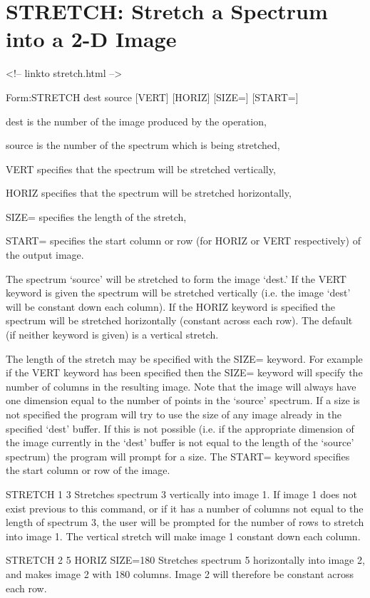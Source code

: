 \section{STRETCH: Stretch a Spectrum into a 2-D Image}
\begin{rawhtml}
<!-- linkto stretch.html -->
\end{rawhtml}
\begin{command}
  \item[Form:STRETCH dest source {[VERT]} {[HORIZ]} {[SIZE=]} 
       {[START=]}\hfill]{}
  \item[dest]{is the number of the image produced by the operation,}
  \item[source]{is the number of the spectrum which is being stretched,}
  \item[VERT]{specifies that the spectrum will be stretched vertically,}
  \item[HORIZ]{specifies that the spectrum will be stretched horizontally,}
  \item[SIZE=]{specifies the length of the stretch,}
  \item[START=]{specifies the start column or row (for HORIZ or
       VERT respectively) of the output image.}
\end{command}

The spectrum `source' will be stretched to form the image `dest.'  If the
VERT keyword is given the spectrum will be stretched vertically (i.e. the
image `dest' will be constant down each column).  If the HORIZ keyword is
specified the spectrum will be stretched horizontally (constant across each
row).  The default (if neither keyword is given) is a vertical stretch.

The length of the stretch may be specified with the SIZE= keyword.  For
example if the VERT keyword has been specified then the SIZE= keyword will
specify the number of columns in the resulting image.  Note that the image
will always have one dimension equal to the number of points in the
`source' spectrum.  If a size is not specified the program will try to use
the size of any image already in the specified `dest' buffer.  If this is
not possible (i.e. if the appropriate dimension of the image currently in
the `dest' buffer is not equal to the length of the `source' spectrum) the
program will prompt for a size.  The START= keyword specifies the start
column or row of the image.

\begin{example}
  \item[STRETCH 1 3\hfill]{Stretches spectrum 3 vertically into image 1.
       If image 1 does not exist previous to this command, or if it has a
       number of columns not equal to the length of spectrum 3, the user
       will be prompted for the number of rows to stretch into image 1.
       The vertical stretch will make image 1 constant down each column.}

  \item[STRETCH 2 5 HORIZ SIZE=180\hfill]{Stretches spectrum 5 horizontally
       into image 2, and makes image 2 with 180 columns.  Image 2 will
       therefore be constant across each row.}
\end{example}


